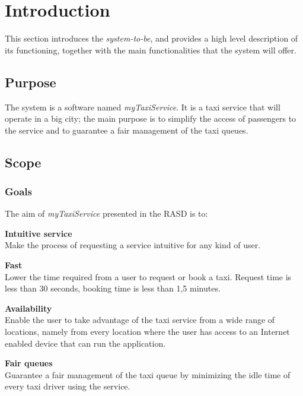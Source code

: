 \section{Introduction}

This section introduces the \emph{system-to-be}, and provides a high level description of its functioning, together with the main functionalities that the system will offer.


\subsection{Purpose}

The system is a software named \emph{myTaxiService}. It is a taxi service that will operate in a big city; the main purpose is to simplify the access of passengers to the service and to guarantee a fair management of the taxi queues.

\subsection{Scope}
\label{sub:scope}
\subsubsection{Goals} %
\label{ssub:goals}
The aim of \emph{myTaxiService} presented in the RASD is to:
\begin{enumerate} [label = \textbf{[G\arabic*]}]
\item \textbf{Intuitive service}\hfill \\
\label{goal:intuitive}
Make the process of requesting a service intuitive for any kind of user.
\item \textbf{Fast}\hfill \\
\label{goal:time}
Lower the time required from a user to request or book a taxi. Request time is less than 30 seconds, booking time is less than 1,5 minutes.
\item \textbf{Availability}\hfill \\
\label{goal:availability}
Enable the user to take advantage of the taxi service from a wide range of locations, namely from every location where the user has access to an Internet enabled device that can run the application.
\item \textbf{Fair queues}\hfill \\
\label{goal:queue}
Guarantee a fair management of the taxi queue by minimizing the idle time of every taxi driver using the service.
\end{enumerate}


